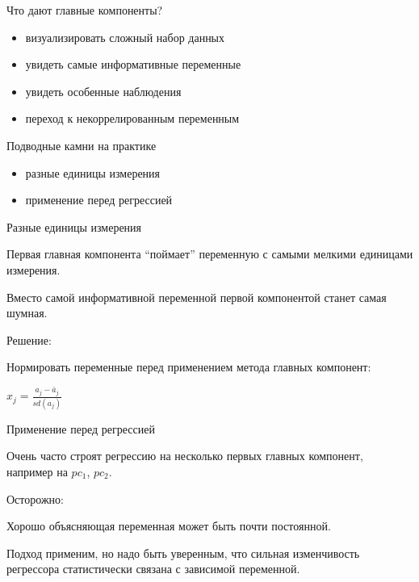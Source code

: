 \documentclass[russian,ignorenonframetext,]{beamer}
\providecommand{\tightlist}{%
  \setlength{\itemsep}{0pt}\setlength{\parskip}{0pt}}
\begin{document}
\begin{frame}{Что дают главные компоненты?}

\begin{itemize}
\tightlist
\item
  визуализировать сложный набор данных
\item
  увидеть самые информативные переменные
\item
  увидеть особенные наблюдения
\item
  переход к некоррелированным переменным
\end{itemize}

\end{frame}

\begin{frame}{Подводные камни на практике}

\begin{itemize}
\tightlist
\item
  разные единицы измерения
\item
  применение перед регрессией
\end{itemize}

\end{frame}

\begin{frame}{Разные единицы измерения}

Первая главная компонента ``поймает'' переменную с самыми мелкими
единицами измерения.

Вместо самой информативной переменной первой компонентой станет самая
шумная.

Решение:

Нормировать переменные перед применением метода главных компонент:

\(x_j=\frac{a_j-\bar{a}_j}{sd(a_j)}\)

\end{frame}

\begin{frame}{Применение перед регрессией}

Очень часто строят регрессию на несколько первых главных компонент,
например на \(pc_1\), \(pc_2\).

Осторожно:

Хорошо объясняющая переменная может быть почти постоянной.

Подход применим, но надо быть уверенным, что сильная изменчивость
регрессора статистически связана с зависимой переменной.

\end{frame}
\end{document}
